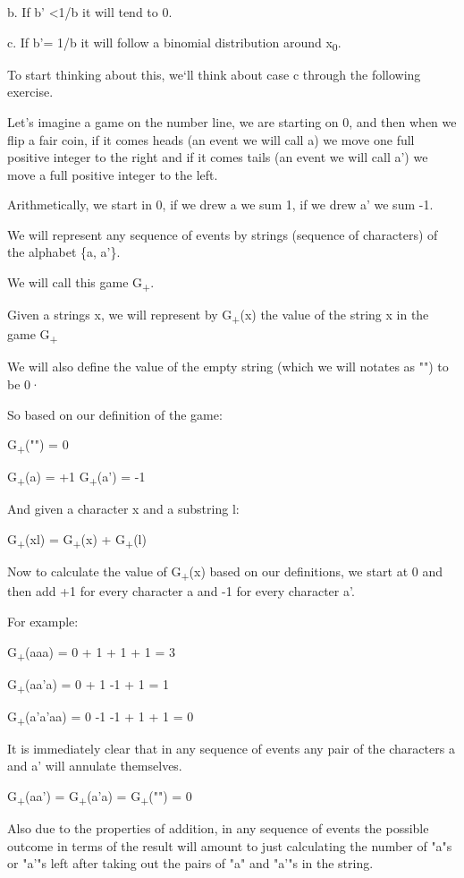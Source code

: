 \documentclass[12pt,reqno]{amsart}
\begin{document}
b. If b' \textless 1/b it will tend to 0.

c. If b'= 1/b it will follow a binomial distribution around x\textsubscript{0}.

To start thinking about this, we`ll think about case c through the following exercise. 

Let's imagine a game on the number line, we are starting on 0, and then when we flip a fair coin, if it comes heads (an event we will call a) we move one full positive integer to the right and if it comes tails (an event we will call a') we move a full positive integer to the left.

Arithmetically, we start in 0, if we drew a we sum 1, if we drew a' we sum -1.

We will represent any sequence of events by strings (sequence of characters) of the alphabet \{a, a'\}. 

We will call this game G\textsubscript{+}.

Given a strings x, we will represent by G\textsubscript{+}(x) the value of the string x in the game G\textsubscript{+}

We will also define the value of the empty string (which we will notates as "") to be 0·

So based on our definition of the game:

G\textsubscript{+}("") = 0

G\textsubscript{+}(a) = +1
G\textsubscript{+}(a') = -1


And given a character x and a substring l:

G\textsubscript{+}(xl) = G\textsubscript{+}(x) + G\textsubscript{+}(l)

Now to calculate the value of G\textsubscript{+}(x) based on our definitions, we start at 0 and then add +1 for every character a and -1 for every character a'.

For example:

G\textsubscript{+}(aaa) = 0 + 1 + 1 + 1 = 3

G\textsubscript{+}(aa'a) = 0 + 1 -1 + 1 = 1

G\textsubscript{+}(a'a'aa) = 0 -1 -1 + 1 + 1 = 0


It is immediately clear that in any sequence of events any pair of the characters a and a' will annulate themselves. 

G\textsubscript{+}(aa') = G\textsubscript{+}(a'a) = G\textsubscript{+}("") = 0


Also due to the properties of addition, in any sequence of events the possible outcome in terms of the result will amount to just calculating the number of "a"s or "a'"s left after taking out the pairs of "a" and "a'"s in the string.
\end{document}
